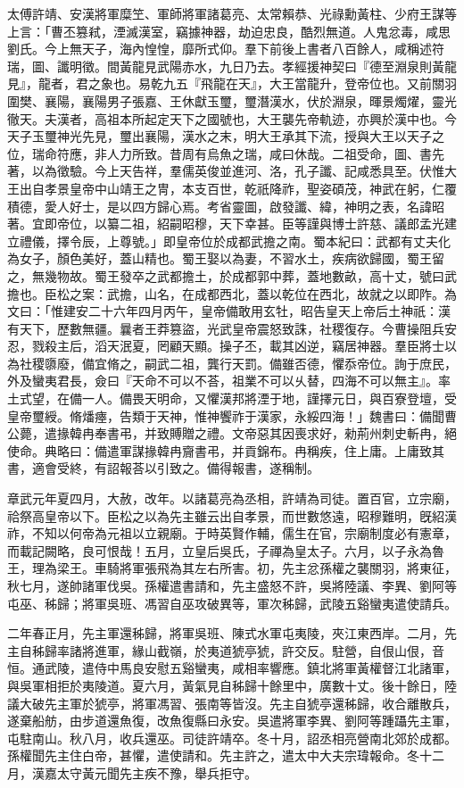 \begin{pinyinscope}
太傅許靖、安漢將軍糜笁、軍師將軍諸葛亮、太常賴恭、光祿勳黃柱、少府王謀等上言：「曹丕篡弒，湮滅漢室，竊據神器，劫迫忠良，酷烈無道。人鬼忿毒，咸思劉氏。今上無天子，海內惶惶，靡所式仰。羣下前後上書者八百餘人，咸稱述符瑞，圖、讖明徵。間黃龍見武陽赤水，九日乃去。孝經援神契曰『德至淵泉則黃龍見』，龍者，君之象也。易乾九五『飛龍在天』，大王當龍升，登帝位也。又前關羽圍樊、襄陽，襄陽男子張嘉、王休獻玉璽，璽潛漢水，伏於淵泉，暉景燭燿，靈光徹天。夫漢者，高祖本所起定天下之國號也，大王襲先帝軌迹，亦興於漢中也。今天子玉璽神光先見，璽出襄陽，漢水之末，明大王承其下流，授與大王以天子之位，瑞命符應，非人力所致。昔周有烏魚之瑞，咸曰休哉。二祖受命，圖、書先著，以為徵驗。今上天告祥，羣儒英俊並進河、洛，孔子讖、記咸悉具至。伏惟大王出自孝景皇帝中山靖王之冑，本支百世，乾祇降祚，聖姿碩茂，神武在躬，仁覆積德，愛人好士，是以四方歸心焉。考省靈圖，啟發讖、緯，神明之表，名諱昭著。宜即帝位，以纂二祖，紹嗣昭穆，天下幸甚。臣等謹與博士許慈、議郎孟光建立禮儀，擇令辰，上尊號。」即皇帝位於成都武擔之南。蜀本紀曰：武都有丈夫化為女子，顏色美好，蓋山精也。蜀王娶以為妻，不習水土，疾病欲歸國，蜀王留之，無幾物故。蜀王發卒之武都擔土，於成都郭中葬，蓋地數畝，高十丈，號曰武擔也。臣松之案：武擔，山名，在成都西北，蓋以乾位在西北，故就之以即阼。為文曰：「惟建安二十六年四月丙午，皇帝備敢用玄牡，昭告皇天上帝后土神祇：漢有天下，歷數無疆。曩者王莽篡盜，光武皇帝震怒致誅，社稷復存。今曹操阻兵安忍，戮殺主后，滔天泯夏，罔顧天顯。操子丕，載其凶逆，竊居神器。羣臣將士以為社稷隳廢，備宜脩之，嗣武二祖，龔行天罰。備雖否德，懼忝帝位。詢于庶民，外及蠻夷君長，僉曰『天命不可以不荅，祖業不可以乆替，四海不可以無主』。率土式望，在備一人。備畏天明命，又懼漢邦將湮于地，謹擇元日，與百寮登壇，受皇帝璽綬。脩燔瘞，告類于天神，惟神饗祚于漢家，永綏四海！」魏書曰：備聞曹公薨，遣掾韓冉奉書弔，并致賻贈之禮。文帝惡其因喪求好，勑荊州刺史斬冉，絕使命。典略曰：備遣軍謀掾韓冉齎書弔，并貢錦布。冉稱疾，住上庸。上庸致其書，適會受終，有詔報荅以引致之。備得報書，遂稱制。

章武元年夏四月，大赦，改年。以諸葛亮為丞相，許靖為司徒。置百官，立宗廟，祫祭高皇帝以下。臣松之以為先主雖云出自孝景，而世數悠遠，昭穆難明，旣紹漢祚，不知以何帝為元祖以立親廟。于時英賢作輔，儒生在官，宗廟制度必有憲章，而載記闕略，良可恨哉！五月，立皇后吳氏，子禪為皇太子。六月，以子永為魯王，理為梁王。車騎將軍張飛為其左右所害。初，先主忿孫權之襲關羽，將東征，秋七月，遂帥諸軍伐吳。孫權遣書請和，先主盛怒不許，吳將陸議、李異、劉阿等屯巫、秭歸；將軍吳班、馮習自巫攻破異等，軍次秭歸，武陵五谿蠻夷遣使請兵。

二年春正月，先主軍還秭歸，將軍吳班、陳式水軍屯夷陵，夾江東西岸。二月，先主自秭歸率諸將進軍，緣山截嶺，於夷道猇亭猇，許交反。駐營，自佷山佷，音恒。通武陵，遣侍中馬良安慰五谿蠻夷，咸相率響應。鎮北將軍黃權督江北諸軍，與吳軍相拒於夷陵道。夏六月，黃氣見自秭歸十餘里中，廣數十丈。後十餘日，陸議大破先主軍於猇亭，將軍馮習、張南等皆沒。先主自猇亭還秭歸，收合離散兵，遂棄船舫，由步道還魚復，改魚復縣曰永安。吳遣將軍李異、劉阿等踵躡先主軍，屯駐南山。秋八月，收兵還巫。司徒許靖卒。冬十月，詔丞相亮營南北郊於成都。孫權聞先主住白帝，甚懼，遣使請和。先主許之，遣太中大夫宗瑋報命。冬十二月，漢嘉太守黃元聞先主疾不豫，舉兵拒守。


\end{pinyinscope}
